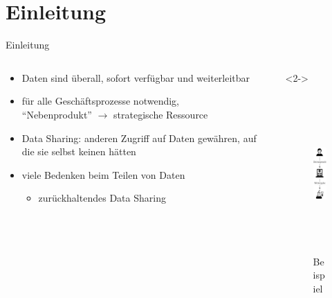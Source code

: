
{
    \section{Einleitung}
}

\begin{frame}{Einleitung}
    \begin{columns}
        \begin{column}{0.7\textwidth}
            \begin{itemize}
                \item Daten sind überall, sofort verfügbar und weiterleitbar
                \item für alle Geschäftsprozesse notwendig,\\
                    \enquote{Nebenprodukt} $\to$ strategische Ressource~\cite{mollerIndustrialDataEcosystems2024}
                
                \item<2-> \alert{Data Sharing}: anderen Zugriff auf Daten gewähren, auf die sie selbst keinen hätten~\cite{mollerIndustrialDataEcosystems2024}
                
                \item<3-> viele Bedenken beim Teilen von Daten~\cite{mollerIndustrialDataEcosystems2024}


                \begin{itemize}    
                    \item<4->[$\Rightarrow$] zurückhaltendes Data Sharing
                \end{itemize}

            \end{itemize}
        \end{column}

        \begin{column}{0.3\textwidth}<2->
            \begin{figure}
                \includegraphics[height=6cm]{./assets/example_vertical.drawio.pdf}
                \caption{Beispiel}
            \end{figure}
        \end{column}
    \end{columns}
\end{frame}


